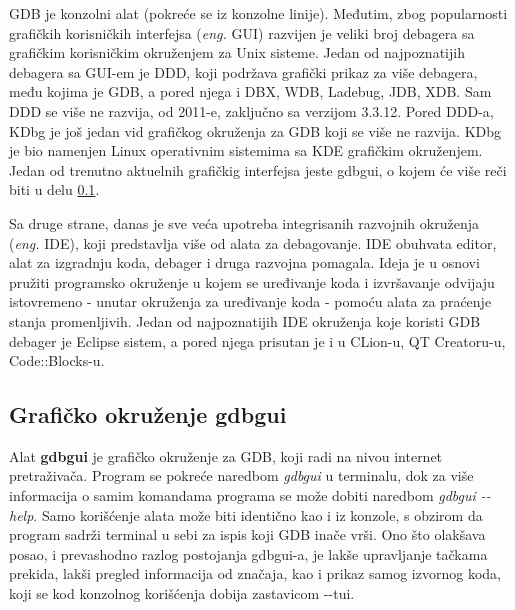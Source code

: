 \documentclass[a4paper]{article}
\begin{document}
GDB je konzolni alat (pokreće se iz konzolne linije). Međutim, zbog popularnosti grafičkih korisničkih interfejsa
(\textit{eng.} GUI) razvijen je veliki broj debagera sa grafičkim korisničkim okruženjem za Unix sisteme\cite{art_debugging}. 
Jedan od najpoznatijih debagera sa GUI-em je DDD, koji podržava grafički prikaz za više debagera, među kojima je
GDB, a pored njega i DBX, WDB, Ladebug, JDB, XDB. Sam DDD se više ne razvija, od 2011-e, zaključno sa verzijom 3.3.12. \cite{GNUOrg}
Pored DDD-a, KDbg je još jedan vid grafičkog okruženja za GDB koji se više ne razvija. KDbg je bio namenjen
Linux operativnim sistemima sa KDE grafičkim okruženjem. Jedan od trenutno aktuelnih grafičkig interfejsa jeste
gdbgui, o kojem će više reči biti u delu \ref{subsec:gdbgui}.

Sa druge strane, danas je sve veća upotreba integrisanih razvojnih okruženja (\textit{eng.} IDE),
koji predstavlja više od alata za debagovanje. IDE obuhvata editor, alat za izgradnju koda, debager i druga 
razvojna pomagala. Ideja je u osnovi pružiti programsko okruženje u kojem se uređivanje koda i izvršavanje
odvijaju istovremeno - unutar okruženja za uređivanje koda - pomoću alata za praćenje stanja promenljivih\cite{computerworld}.
Jedan od najpoznatijih IDE okruženja koje koristi GDB debager je Eclipse sistem,
a pored njega prisutan je i u CLion-u, QT Creatoru-u, Code::Blocks-u\cite{sourceware}.

\subsection{Grafičko okruženje gdbgui}
\label{subsec:gdbgui}

Alat \textbf{gdbgui} je grafičko okruženje za GDB, koji radi na nivou internet pretraživača.
Program se pokreće naredbom \textit{gdbgui} u terminalu, dok za više informacija o samim komandama
programa se može dobiti naredbom \textit{gdbgui -\phantom{}-help}\cite{gdbgui}. Samo korišćenje alata može biti
identično kao i iz konzole, s obzirom da program sadrži terminal u sebi za ispis koji GDB inače vrši. Ono 
što olakšava posao, i prevashodno razlog postojanja gdbgui-a, je lakše upravljanje tačkama prekida,
lakši pregled informacija od značaja, kao i prikaz samog izvornog koda, koji se kod konzolnog korišćenja 
dobija zastavicom -\phantom{}-tui.
\end{document}
